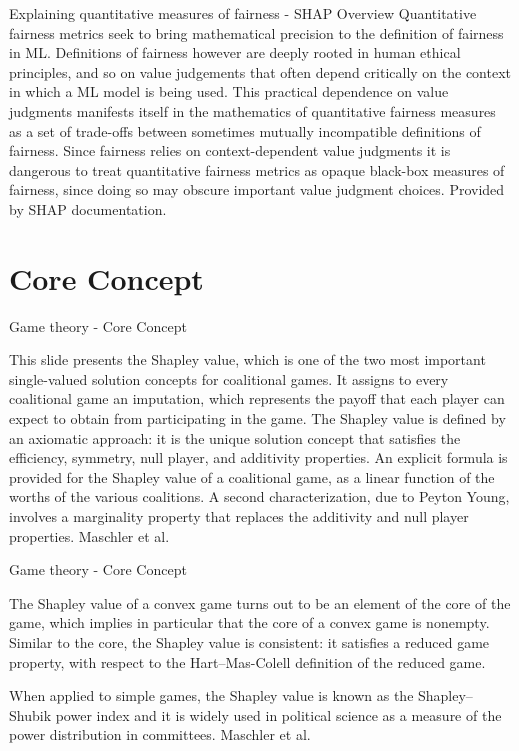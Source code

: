 \documentclass[aspectratio=169]{beamer}
\begin{document}
\begin{frame}{Explaining quantitative measures of fairness - \ac{SHAP} Overview}
    Quantitative fairness metrics seek to bring mathematical precision to the definition of fairness in \ac{ML}. Definitions of fairness however are deeply rooted in human ethical principles, and so on value judgements that often depend critically on the context in which a \ac{ML} model is being used. This practical dependence on value judgments manifests itself in the mathematics of quantitative fairness measures as a set of trade-offs between sometimes mutually incompatible definitions of fairness. Since fairness relies on context-dependent value judgments it is dangerous to treat quantitative fairness metrics as opaque black-box measures of fairness, since doing so may obscure important value judgment choices. Provided by \ac{SHAP} documentation.
\end{frame}

\section{Core Concept}

\begin{frame}{Game theory - Core Concept}

This slide presents the Shapley value, which is one of the two most important single-valued solution concepts for coalitional games. It assigns to every coalitional game an imputation, which represents the payoff that each player can expect to obtain from participating in the game. The Shapley value is defined by an axiomatic approach: it is the unique solution concept that satisfies the efficiency, symmetry, null player, and additivity properties. An explicit formula is provided for the Shapley value of a coalitional game, as a linear function of the worths of the various coalitions. A second characterization, due to Peyton Young, involves a marginality property that replaces the additivity and null player properties. Maschler et al. \cite{cup_2013}
    
\end{frame}

\begin{frame}{Game theory - Core Concept}

The Shapley value of a convex game turns out to be an element of the core of the game, which implies in particular that the core of a convex game is nonempty. Similar to the core, the Shapley value is consistent: it satisfies a reduced game property, with respect to the Hart–Mas-Colell definition of the reduced game.

When applied to simple games, the Shapley value is known as the Shapley–Shubik power index and it is widely used in political science as a measure of the power distribution in committees. Maschler et al. \cite{cup_2013}
    
\end{frame}
\end{document}

